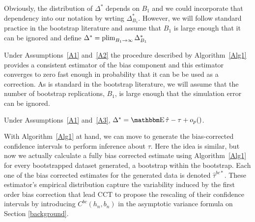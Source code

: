 \documentclass[12pt,fleqn]{article}
\begin{document}
Obviously, the distribution of $\Delta^*$ depends on $B_1$ and we could
incorporate that dependency into our notation by wrting
$\Delta^*_{B_1}$. However, we will follow standard practice in the bootstrap
literature and assume that $B_1$ is large enough that it can be ignored and
define $\Delta^* = \operatorname*{plim}_{B_1 \to \infty} \Delta^*_{B_1}$

Under Assumptions~\ref{A1} and~\ref{A2} the procedure described by
Algorithm~\ref{Alg1} provides a consistent estimator of the bias component and
this estimator converges to zero fast enough in probability that it can be be
used as a correction. As is standard in the bootstrap literature, we will assume
that the number of bootstrap replications, $B_1$, is large enough that the
simulation error can be ignored.

\begin{lemma}\label{L1}
  Under Assumptions~\ref{A1} and~\ref{A3},
  $\Delta^* = \E \hat\tau - \tau + o_p()$.
\end{lemma}

With Algorithm~\ref{Alg1} at hand, we can move to generate the bias-corrected confidence intervals to perform inference about $\tau$. Here the idea is similar, but now we actually calculate a fully bias corrected estimate using Algorithm~\ref{Alg1} for every bootstrapped dataset generated, a bootstrap within the bootstrap. Each one of the bias corrected estimates for the generated data is denoted $\hat{\tau}^{bc*}$. These estimator's empirical distribution capture the variability induced by the first order bias correction that lead CCT to propose the rescaling of their confidence intervals by introducing $C^{bc}(h_{n},b_{n})$ in the asymptotic variance formula on Section \ref{background}.
\end{document}
